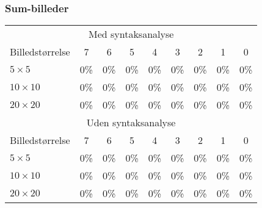 \begin{comment}
\begin{tabular}{|l|c|c|c|}\hline
\rowcolor[gray]{0.9} \multicolumn{4}{|>{\columncolor[gray]{0.9}}c|}{\textbf{Træningssæt}} \\ \hline
Vektorlængde & Alle tegn & Bogstaver & Tal \\\hline
9 & 0\% & 0\% & 0\% \\\hline
16 & 0\% & 0\% & 0\%\\\hline
25 & 0\% & 0\% & 0\%\\\hline \end{tabular}

\begin{tabular}{|l|c|c|c|}\hline
\rowcolor[gray]{0.9} \multicolumn{4}{|>{\columncolor[gray]{0.9}}c|}{\textbf{Kontrolsæt}} \\ \hline
Vektorlængde & Alle tegn & Bogstaver & Tal \\\hline
9 & 0\% & 0\% & 0\% \\\hline
16 & 0\% & 0\% & 0\% \\\hline
25 & 0\% & 0\% & 0\% \\\hline \end{tabular}
\end{comment}

\subsubsection*{Sum-billeder}

\begin{tabular}{|l|c|c|c|c|c|c|c|c|}\hline
\rowcolor[gray]{0.9} \multicolumn{9}{|>{\columncolor[gray]{0.9}}c|}{\textbf{Træningssæt}} \\\hline
\multicolumn{9}{|c|}{Med syntaksanalyse}\\\hline
Billedstørrelse & 7 & 6 & 5 & 4 & 3 & 2 & 1 & 0\\\hline
$5 \times 5$ & 0\% & 0\% & 0\% & 0\% & 0\% & 0\% & 0\% & 0\% \\\hline
$10 \times 10$ & 0\% & 0\% & 0\% & 0\% & 0\% & 0\% & 0\% & 0\%\\\hline
$20 \times 20$ & 0\% & 0\% & 0\% & 0\% & 0\% & 0\% & 0\% & 0\%\\\hline 
\multicolumn{9}{|c|}{Uden syntaksanalyse}\\\hline
Billedstørrelse & 7 & 6 & 5 & 4 & 3 & 2 & 1 & 0\\\hline
$5 \times 5$ & 0\% & 0\% & 0\% & 0\% & 0\% & 0\% & 0\% & 0\% \\\hline
$10 \times 10$ & 0\% & 0\% & 0\% & 0\% & 0\% & 0\% & 0\% & 0\%\\\hline
$20 \times 20$ & 0\% & 0\% & 0\% & 0\% & 0\% & 0\% & 0\% & 0\%\\\hline \end{tabular}

